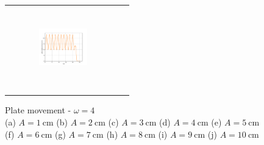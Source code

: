 \begin{figure}[H]
\begin{center}
\begin{tabular}{cc}
\includegraphics[width=0.45\textwidth, height=3.5cm]{graph/omega=1.00_A=7_plate.pdf}
&
\\
&
\\
\end{tabular}
\end{center}
\caption{Plate movement - $\omega=4$ \\ (a) $A=1\mathrm{~cm}$ (b) $A=2\mathrm{~cm}$ (c) $A=3\mathrm{~cm}$ (d) $A=4\mathrm{~cm}$ (e) $A=5\mathrm{~cm}$\\(f) $A=6\mathrm{~cm}$ (g) $A=7\mathrm{~cm}$ (h) $A=8\mathrm{~cm}$ (i) $A=9\mathrm{~cm}$ (j) $A=10\mathrm{~cm}$}
\label{Data_omega=4_plate}
\end{figure}

